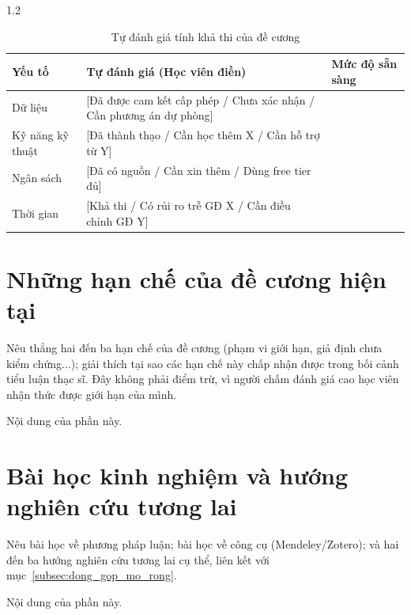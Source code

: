 \begin{spacing}{1.2}
\begin{table}[htpb]
\centering
\caption{Tự đánh giá tính khả thi của đề cương}
\label{tab:kha_thi}
\renewcommand{\arraystretch}{1.3}
{\fontsize{12}{14}\selectfont
\begin{tabularx}{\textwidth}{|>{\raggedright\arraybackslash}p{3.5cm}|X|>{\centering\arraybackslash}p{3.5cm}|}
\hline
\textbf{Yếu tố} & \textbf{Tự đánh giá (Học viên điền)} & \textbf{Mức độ sẵn sàng} \\
\hline
Dữ liệu & [Đã được cam kết cấp phép / Chưa xác nhận / Cần phương án dự phòng] & [Cao / TB / Thấp] \\
\hline
Kỹ năng kỹ thuật & [Đã thành thạo / Cần học thêm X / Cần hỗ trợ từ Y] & [Cao / TB / Thấp] \\
\hline
Ngân sách & [Đã có nguồn / Cần xin thêm / Dùng free tier đủ] & [Cao / TB / Thấp] \\
\hline
Thời gian & [Khả thi / Có rủi ro trễ GĐ X / Cần điều chỉnh GĐ Y] & [Cao / TB / Thấp] \\
\hline
\end{tabularx}
}
\end{table}

\section{Những hạn chế của đề cương hiện tại}
\label{sec:kl_han_che}

\begin{huongdan}
Nêu thẳng hai đến ba hạn chế của đề cương (phạm vi giới hạn, giả định chưa kiểm chứng...); giải thích tại sao các hạn chế này chấp nhận được trong bối cảnh tiểu luận thạc sĩ. Đây không phải điểm trừ, vì người chấm đánh giá cao học viên nhận thức được giới hạn của mình.
\end{huongdan}

Nội dung của phần này.

\section{Bài học kinh nghiệm và hướng nghiên cứu tương lai}
\label{sec:kl_bai_hoc}

\begin{huongdan}
Nêu bài học về phương pháp luận; bài học về công cụ (Mendeley/Zotero); và hai đến ba hướng nghiên cứu tương lai cụ thể, liên kết với mục~\ref{subsec:dong_gop_mo_rong}.
\end{huongdan}

Nội dung của phần này.

\end{spacing}
